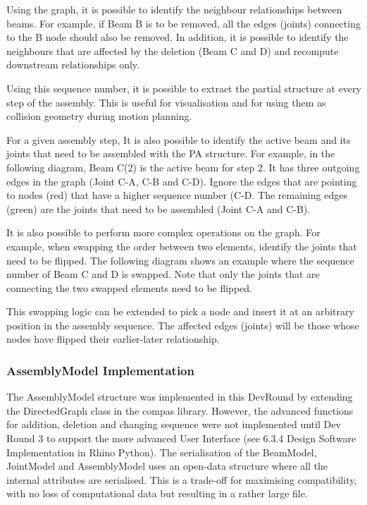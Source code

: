\begin{itemize}
Using the graph, it is possible to identify the neighbour relationships between beams. For example, if Beam B is to be removed, all the edges (joints) connecting to the B node should also be removed. In addition, it is possible to identify the neighbours that are affected by the deletion (Beam C and D) and recompute downstream relationships only. 

Using this sequence number, it is possible to extract the partial structure at every step of the assembly. This is useful for visualisation and for using them as collision geometry during motion planning.

For a given assembly step, It is also possible to identify the active beam and its joints that need to be assembled with the PA structure. For example, in the following diagram, Beam C(2) is the active beam for step 2. It has three outgoing edges in the graph (Joint C-A, C-B and C-D). Ignore the edges that are pointing to nodes (red) that have a higher sequence number (C-D. The remaining edges (green) are the joints that need to be assembled (Joint C-A and C-B). 

It is also possible to perform more complex operations on the graph. For example, when swapping the order between two elements, identify the joints that need to be flipped. The following diagram shows an example where the sequence number of Beam C and D is swapped. Note that only the joints that are connecting the two swapped elements need to be flipped.

This swapping logic can be extended to pick a node and insert it at an arbitrary position in the assembly sequence.  The affected edges (joints) will be those whose nodes have flipped their earlier-later relationship. 

\subsubsection{AssemblyModel Implementation}
The AssemblyModel structure was implemented in this DevRound by extending the DirectedGraph class in the compas library. However, the advanced functions for addition, deletion and changing sequence were not implemented until Dev Round 3 to support the more advanced User Interface (see 6.3.4 Design Software Implementation in Rhino Python).
The serialisation of the BeamModel, JointModel and AssemblyModel uses an open-data structure where all the internal attributes are serialised. This is a trade-off for maximising compatibility, with no loss of computational data but resulting in a rather large file. 


\end{itemize}
